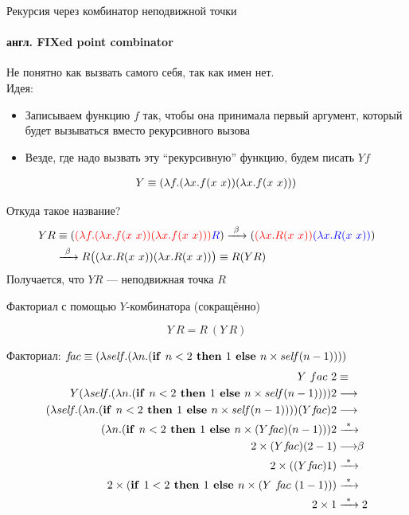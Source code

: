 \newcommand\Y{\ensuremath{Y}}
\begin{frame}{Рекурсия через комбинатор неподвижной точки}
\framesubtitle{англ. FIXed point combinator}
\def\Yimpl{\ensuremath{\lam{f}{\lam{x}{f(x\ x)}\lam{x}{f(x\ x)}}}}
Не понятно как вызвать самого себя, так как имен нет.\\

Идея:
\begin{itemize}
  \item Записываем функцию $f$ так, чтобы она принимала первый аргумент, который будет вызываться вместо рекурсивного вызова
  \item Везде, где надо вызвать эту \enquote{рекурсивную} функцию, будем писать $Yf$

  \begin{align*}
     Y\equiv \Yimpl
  \end{align*}
\end{itemize}

Откуда такое название?
\begin{align*}
YR &\equiv     \redex{\Yimpl}{R} \arrbeta \redex{\lam{x}{R(x\ x)}}{\lam{x}{R(x\ x)}} \\
&\arrbeta  R\big( \lam{x}{R(x\ x)}\lam{x}{R(x\ x)} \big)  \equiv R(YR)
\end{align*}
Получается, что $YR$ --- неподвижная точка $R$
\end{frame}


\newcommand{\ite}[3]{\ensuremath{(\text{\textbf{if }} #1\text{\textbf{ then }}#2\text{\textbf{ else }}#3})}
\newcommand{\FIX}{\texttt{FIX}}
\newcommand{\self}{\ensuremath{sel\!f}}

\begin{frame}{Факториал с помощью $Y$-комбинатора (сокращённо)}
\def\Yfac{\ensuremath{\app{\Y}{f\!ac}}}
\vspace{-1.6em}

\newcommand{\FAC}{\ensuremath{\lam{\self}{\lam{n}{ \ite{n<2}{1}{n \times \self(n-1)}}}}}
\[
\Y\ R = R\ (\Y\ R)
\]


Факториал: $f\!ac \equiv \FAC$\\

\begin{align*}
  \Y\ fac\ 2 & \equiv \\
  \Y \FAC 2 & \longrightarrow\\
  \FAC \Yfac 2 & \longrightarrow\\
  (\lambda n . \ite{n<2}{1}{n \times \Yfac (n-1)}) 2 & \arrmany \\
  2 \times \Yfac (2-1) & \betaarr \\
  2 \times (\Yfac 1) & \arrmany \\
  2 \times \ite{1<2}{1}{n \times (\Y\ f\!ac\ (1-1))} & \arrmany \\
  2 \times 1 & \arrmany 2
\end{align*}
 \end{frame}




